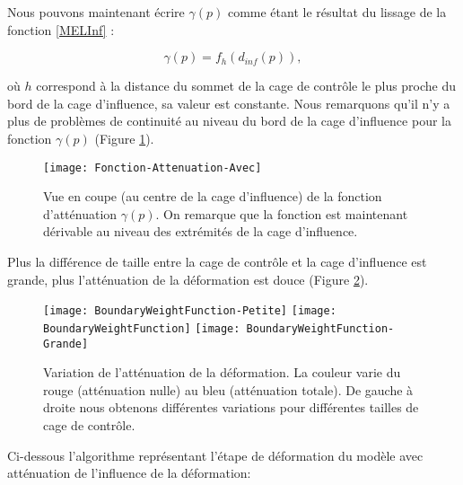 Nous pouvons maintenant écrire $\gamma(p)$ comme étant le résultat du lissage
de la fonction \ref{MELInf} :

\begin{equation}
  \gamma(p) = f_h(d_{inf}(p)),
\end{equation}

où $h$ correspond à la distance du sommet de la cage de contrôle le plus
proche du bord de la cage d'influence, sa valeur est constante. Nous
remarquons qu'il n'y a plus de problèmes de continuité au niveau du bord de la
cage d'influence pour la fonction $\gamma(p)$ (Figure \ref{MELAtL}).

\begin{figure}[ht]
\begin{center}
\texttt{[image: Fonction-Attenuation-Avec]}

\caption[Fonction d'atténuation $\gamma$(p)] {Vue en coupe (au centre de la
cage d'influence) de la fonction d'atténuation $\gamma(p)$. On remarque que la
fonction est maintenant dérivable au niveau des extrémités de la cage
d'influence.}

\label{MELAtL}

\end{center}
\end{figure}

Plus la différence de taille entre la cage de contrôle et la cage d'influence
est grande, plus l'atténuation de la déformation est douce (Figure
\ref{MELBou}).

\begin{figure}[ht]
  \begin{center}
    \texttt{[image: BoundaryWeightFunction-Petite]}
    \texttt{[image: BoundaryWeightFunction]}
    \texttt{[image: BoundaryWeightFunction-Grande]}

    \caption[Variation de l'atténuation de la déformation] {Variation de
l'atténuation de la déformation. La couleur varie du rouge (atténuation nulle)
au bleu (atténuation totale). De gauche à droite nous obtenons différentes
variations pour différentes tailles de cage de contrôle.}

    \label{MELBou}
  \end{center}
\end{figure}

Ci-dessous l'algorithme représentant l'étape de déformation du modèle avec
atténuation de l'influence de la déformation: \\



